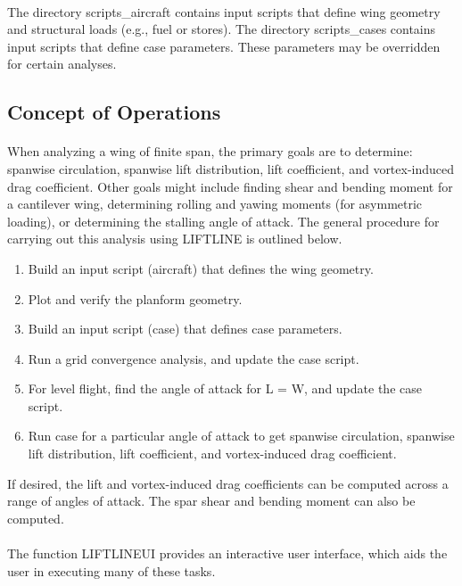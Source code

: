 \documentclass{article}
\begin{document}
\paragraph{}
The directory scripts\_aircraft contains input scripts that define
wing geometry and structural loads (e.g., fuel or stores).  The
directory scripts\_cases contains input scripts that define case
parameters.  These parameters may be overridden for certain analyses.
\subsection{Concept of Operations}
\paragraph{}
When analyzing a wing of finite span, the primary goals are to
determine: spanwise circulation, spanwise lift distribution, lift
coefficient, and vortex-induced drag coefficient.  Other goals might
include finding shear and bending moment for a cantilever wing,
determining rolling and yawing moments (for asymmetric loading), or
determining the stalling angle of attack.  The general procedure for
carrying out this analysis using LIFTLINE is outlined below.
\begin{enumerate}
\item Build an input script (aircraft) that defines the wing geometry.
\item Plot and verify the planform geometry.
\item Build an input script (case) that defines case parameters.
\item Run a grid convergence analysis, and update the case script.
\item For level flight, find the angle of attack for L = W, and update
  the case script.
\item Run case for a particular angle of attack to get spanwise
  circulation, spanwise lift distribution, lift coefficient, and
  vortex-induced drag coefficient.
\end{enumerate}
If desired, the lift and vortex-induced drag coefficients can be
computed across a range of angles of attack.  The spar shear and
bending moment can also be computed.
\paragraph{}
The function LIFTLINEUI provides an interactive user interface, which
aids the user in executing many of these tasks.
\end{document}
